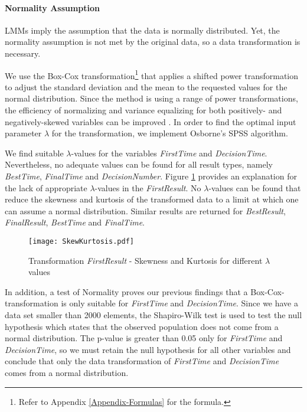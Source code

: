 \paragraph{Normality Assumption}
\ac{LMM}s imply the assumption that the data is normally distributed. Yet, the normality assumption is not met by the original data, so a data transformation is necessary.

We use the Box-Cox transformation\footnote{Refer to Appendix \ref{Appendix-Formulas} for the formula.} \citep{Sakia1992} that applies a shifted power transformation to adjust the standard deviation and the mean to the requested values for the normal distribution. Since the method is using a range of power transformations, the efficiency of normalizing and variance equalizing for both positively- and negatively-skewed variables can be improved \citep{Osborne2010}. In order to find the optimal input parameter $\lambda$ for the transformation, we implement Osborne's SPSS algorithm.

We find suitable $\lambda$-values for the variables \textit{FirstTime} and \textit{DecisionTime}. Nevertheless, no adequate values can be found for all result types, namely \textit{BestTime}, \textit{FinalTime} and \textit{DecisionNumber}.
Figure \ref{fig:SkewKurtosis} provides an explanation for the lack of appropriate $\lambda$-values in the \textit{FirstResult}. No $\lambda$-values can be found that reduce the skewness and kurtosis of the transformed data to a limit at which one can assume a normal distribution. Similar results are returned for \textit{BestResult}, \textit{FinalResult}, \textit{BestTime} and \textit{FinalTime}.
\begin{figure}[htbp] %
\begin{center} 
\texttt{[image: SkewKurtosis.pdf]}
  \caption{Transformation \textit{FirstResult} - Skewness and Kurtosis for different $\lambda$ values}
    \label{fig:SkewKurtosis} 
\end{center}
\end{figure}
In addition, a test of Normality proves our previous findings that a Box-Cox-transformation is only suitable for \textit{FirstTime} and \textit{DecisionTime}. Since we have a data set smaller than 2000 elements, the Shapiro-Wilk test \citep{Shapiro1965} is used to test the null hypothesis which states that the observed population does not come from a normal distribution. The p-value is greater than 0.05 only for \textit{FirstTime} and \textit{DecisionTime}, so we must retain the null hypothesis for all other variables and conclude that only the data transformation of \textit{FirstTime} and \textit{DecisionTime} comes from a normal distribution.


